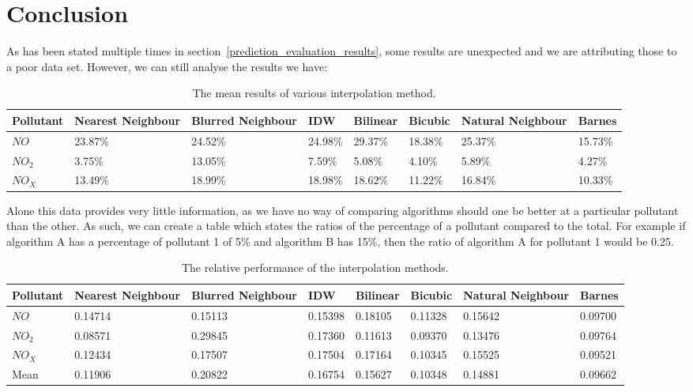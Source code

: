 	\section{Conclusion}


		As has been stated multiple times in section~\ref{prediction_evaluation_results}, some results are unexpected and we are attributing those to a poor data set. However, we can still analyse the results we have:

		\begin{table}[H]
			\centering
    		\begin{tabularx}{\linewidth}{|X|X|X|X|X|X|X|X|}
    			\hline
				Pollutant & Nearest Neighbour & Blurred Neighbour & IDW & Bilinear & Bicubic & Natural Neighbour & Barnes \\ \hline
				$NO$ & 23.87\% & 24.52\% & 24.98\% & 29.37\% & 18.38\% & 25.37\% & 15.73\% \\
				$NO_{2}$ & 3.75\% & 13.05\% & 7.59\% & 5.08\% & 4.10\% & 5.89\% & 4.27\% \\
				$NO_{X}$ & 13.49\% & 18.99\% & 18.98\% & 18.62\% & 11.22\% & 16.84\% & 10.33\% \\
				\hline
			\end{tabularx}
			\caption{The mean results of various interpolation method.}
			\label{tab:all_results}
		\end{table}

		Alone this data provides very little information, as we have no way of comparing algorithms should one be better at a particular pollutant than the other. As such, we can create a table which states the ratios of the percentage of a pollutant compared to the total. For example if algorithm A has a percentage of pollutant 1 of 5\% and algorithm B has 15\%, then the ratio of algorithm A for pollutant 1 would be 0.25.

		\begin{table}[H]
			\centering
    		\begin{tabularx}{\linewidth}{|X|X|X|X|X|X|X|X|}
    			\hline
				Pollutant & Nearest Neighbour & Blurred Neighbour & IDW & Bilinear & Bicubic & Natural Neighbour & Barnes \\ \hline
				$NO$ & 0.14714 & 0.15113 & 0.15398 & 0.18105 & 0.11328 & 0.15642 & 0.09700 \\
				$NO_{2}$ & 0.08571 & 0.29845 & 0.17360 & 0.11613 & 0.09370 & 0.13476 & 0.09764\\
				$NO_{X}$ & 0.12434 & 0.17507 & 0.17504 & 0.17164 & 0.10345 & 0.15525 & 0.09521 \\ \hline
				Mean & 0.11906 & 0.20822 & 0.16754 & 0.15627 & 0.10348 & 0.14881 & 0.09662 \\
				\hline
			\end{tabularx}
			\caption{The relative performance of the interpolation methods.}
			\label{tab:all_ratio_results}
		\end{table}

